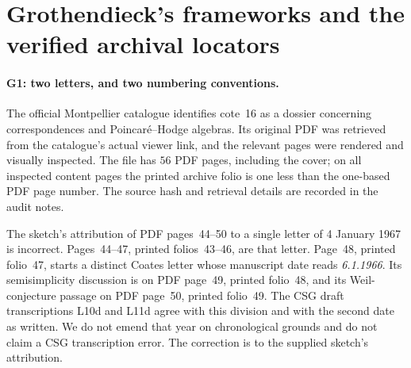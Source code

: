 \section{Grothendieck's frameworks and the verified archival locators}\label{sec:archive}
\paragraph{G1: two letters, and two numbering conventions.}
The official Montpellier catalogue identifies cote~16 as a dossier concerning correspondences and Poincar\'e--Hodge algebras. Its original PDF was retrieved from the catalogue's actual viewer link, and the relevant pages were rendered and visually inspected. The file has $56$ PDF pages, including the cover; on all inspected content pages the printed archive folio is one less than the one-based PDF page number. The source hash and retrieval details are recorded in the audit notes.

The sketch's attribution of PDF pages~44--50 to a single letter of 4 January 1967 is incorrect. Pages~44--47, printed folios~43--46, are that letter. Page~48, printed folio~47, starts a distinct Coates letter whose manuscript date reads \emph{6.1.1966}. Its semisimplicity discussion is on PDF page~49, printed folio~48, and its Weil-conjecture passage on PDF page~50, printed folio~49. The CSG draft transcriptions L10d and L11d agree with this division and with the second date as written. We do not emend that year on chronological grounds and do not claim a CSG transcription error. The correction is to the supplied sketch's attribution.

